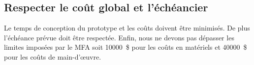 

\subsection{Respecter le coût global et l’échéancier}
\label{s:beo_obj_respcouteche}

Le temps de conception du prototype et les coûts doivent être minimisés.
De plus l’échéance prévue doit être respectée.
Enfin, nous ne devons pas dépasser les limites imposées par le MFA soit 10000~\$ pour les coûts en matériels et 40000~\$ pour les coûts de main-d’œuvre.
